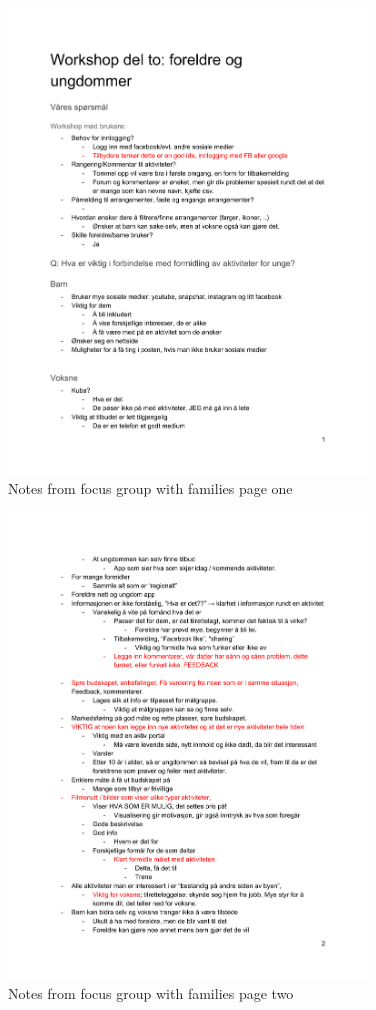\begin{figure}[H]
\centering
    \includegraphics[width=0.85\textwidth]{fig/workshop/users/WSBrukere_1.pdf}
    \caption{Notes from focus group with families page one}
    \label{Users_1}
\end{figure}

\begin{figure}[H]
\centering
    \includegraphics[width=0.85\textwidth]{fig/workshop/users/WSBrukere_2.pdf}
    \caption{Notes from focus group with families page two}
    \label{Users_2}
\end{figure}

